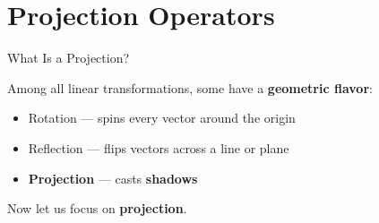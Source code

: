 \documentclass[10pt]{beamer}
\theoremstyle{definition}
\newcommand{\x}[1]{\alert{\textbf{#1}}}
\begin{document}
\section{Projection Operators}

\begin{frame}{What Is a Projection?}

Among all linear transformations, some have a \x{geometric flavor}:

\vspace{0.5em}

\begin{itemize}
\item Rotation --- spins every vector around the origin
\item Reflection --- flips vectors across a line or plane
\item \x{Projection} --- casts \x{shadows}
\end{itemize}

\end{frame}

\begin{frame}{}

\vspace{3em}

\begin{center}
{\Large Now let us focus on \x{projection}.}
\end{center}

\end{frame}
\end{document}
